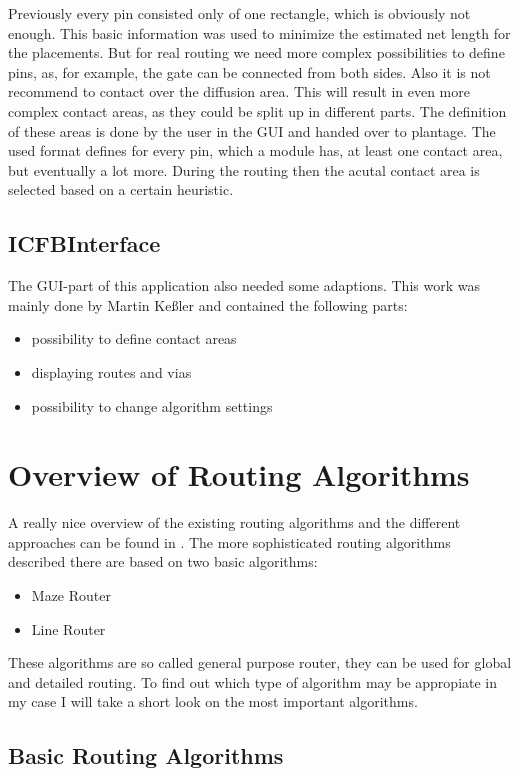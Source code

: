 Previously every pin consisted only of one rectangle, which is obviously not enough. This basic information was used to minimize the estimated net length for the placements. But for real routing we need more complex possibilities to define pins, as, for example, the gate can be connected from both sides. Also it is not recommend to contact over the diffusion area. This will result in even more complex contact areas, as they could be split up in different parts. The definition of these areas is done by the user in the GUI and handed over to plantage. The used format defines for every pin, which a module has, at least one contact area, but eventually a lot more. During the routing then the acutal contact area is selected based on a certain heuristic.

\subsection{ICFBInterface}
The GUI-part of this application also needed some adaptions. This work was mainly done by Martin Keßler and contained the following parts:

\begin{itemize}
\item possibility to define contact areas
\item displaying routes and vias
\item possibility to change algorithm settings
\end{itemize}	

\section{Overview of Routing Algorithms}
A really nice overview of the existing routing algorithms and the different approaches can be found in \cite[page 149 till 201]{springer:eda_analog_routing}. The more sophisticated routing algorithms described there are based on two basic algorithms:
\begin{itemize}
\item Maze Router
\item Line Router
\end{itemize}
These algorithms are so called general purpose router, they can be used for global and detailed routing. To find out which type of algorithm may be appropiate in my case I will take a short look on the most important algorithms.

\subsection{Basic Routing Algorithms}
